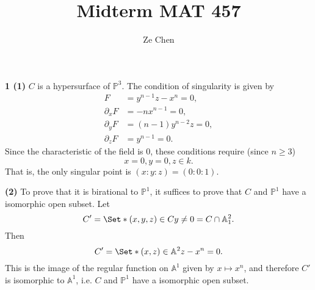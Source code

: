 \documentclass{article}
\title{Midterm MAT 457}
\author{Ze Chen}
\makeatletter
\newcommand*{\shifttext}[1]{%
  \settowidth{\@tempdima}{#1}%
  \hspace{-\@tempdima}#1%
}
\newcommand{\plabel}[1]{%
\shifttext{\textbf{#1}\quad}%
}
\newcommand{\prule}{%
\begin{center}%
\hdashrule[0.5ex]{.99\linewidth}{1pt}{1pt 2.5pt}%
\end{center}%
}
\makeatother
\begin{document}
\maketitle

\plabel{1 (1)}%
$C$ is a hypersurface of $\mathbb{P}^3$.
The condition of singularity is given by
\begin{align*}
    F &= y^{n-1}z - x^n = 0, \\
    \partial_x F &= -n x^{n-1} = 0, \\
    \partial_y F &= (n-1) y^{n-2}z  = 0, \\
    \partial_z F &= y^{n-1} = 0.
\end{align*}
Since the characteristic of the field is $0$, these conditions require (since $n\ge 3$)
\[ x = 0, y = 0, z\in k. \]
That is, the only singular point is $(x:y:z) = (0:0:1)$.

\plabel{(2)}%
To prove that it is birational to $\mathbb{P}^1$, it suffices to prove that $C$ and $\mathbb{P}^1$ have a isomorphic open subset.
Let
\[ C' = \Set*{(x,y,z)\in C}{y\neq 0} = C \cap \mathbb{A}^2_1. \]
Then
\[ C' = \Set*{(x,z)\in \mathbb{A}^2}{z - x^n = 0}. \]
This is the image of the regular function on $\mathbb{A}^1$ given by $x \mapsto x^n$, and therefore $C'$ is isomorphic to $\mathbb{A}^1$, i.e. $C$ and $\mathbb{P}^1$ have a isomorphic open subset.

\prule
\end{document}
